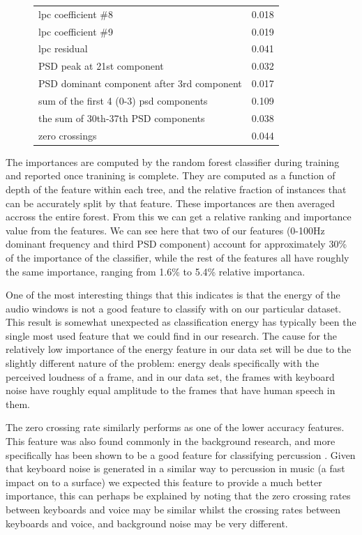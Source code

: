 \documentclass[ %
                    author={Sam Phippen},
                supervisor={Dr. Rafal Bogacz},
                     title={Real time voice activity detectors in noisy personal computing environments},
                  subtitle={},
                    degree={MEng},
                      year={2012} ]{thesis}
\begin{document}
\begin{figure}
\begin{tabular}{| l | l |}
        lpc coefficient \#8                        & 0.018 \\
        lpc coefficient \#9                        & 0.019 \\
        lpc residual                               & 0.041 \\
        PSD peak at 21st component                 & 0.032 \\
        PSD dominant component after 3rd component & 0.017 \\
        sum of the first 4 (0-3) psd components    & 0.109 \\
        the sum of 30th-37th PSD components        & 0.038 \\
        zero crossings                             & 0.044  \\
    \hline
    \end{tabular}
\end{figure}

The importances are computed by the random forest classifier during training
and reported once tranining is complete. They are computed as a function of
depth of the feature within each tree, and the relative fraction of instances
that can be accurately split by that feature. These importances are then
averaged accross the entire forest. From this we can get a relative ranking and
importance value from the features. We can see here that two of our features
(0-100Hz dominant frequency and third PSD component) account for approximately
30\% of the importance of the classifier, while the rest of the features all
have roughly the same importance, ranging from 1.6\% to 5.4\% relative
importanca.

One of the most interesting things that this indicates is that the
energy of the audio windows is not a good feature to classify with on our
particular dataset. This result is somewhat unexpected as classification energy
has typically been the single most used feature that we could find in our
research. The cause for the relatively low importance of the energy feature in
our data set will be due to the slightly different nature of the problem:
energy deals specifically with the perceived loudness of a frame, and in our
data set, the frames with keyboard noise have roughly equal amplitude to the
frames that have human speech in them.

The zero crossing rate similarly performs as one of the lower accuracy
features. This feature was also found commonly in the background research, and
more specifically has been shown to be a good feature for classifying
percussion \cite{gouyon}. Given that keyboard noise is generated in a similar
way to percussion in music (a fast impact on to a surface) we expected this
feature to provide a much better importance, this can perhaps be explained by
noting that the zero crossing rates between keyboards and voice may be similar
whilst the crossing rates between keyboards and voice, and background noise may
be very different.
\end{document}
